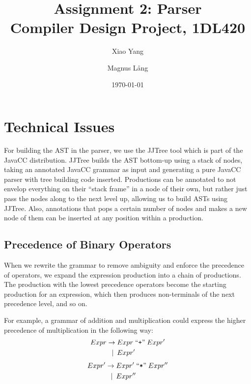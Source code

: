 \documentclass[a4paper,11pt]{article}
\title{Assignment 2: Parser \\
       Compiler Design Project, 1DL420}
\author{Xiao Yang \and Magnus L{\aa}ng} %
\date{\today}
\begin{document}
\maketitle

\section{Technical Issues}
For building the AST in the parser, we use the JJTree tool which is part of the JavaCC distribution.
JJTree builds the AST bottom-up using a stack of nodes, taking an annotated JavaCC grammar as input and generating a pure JavaCC parser with tree building code inserted.
Productions can be annotated to not envelop everything on their ``stack frame'' in a node of their own, but rather just pass the nodes along to the next level up, allowing us to build ASTs using JJTree.
Also, annotations that pops a certain number of nodes and makes a new node of them can be inserted at any position within a production.

\subsection{Precedence of Binary Operators}
When we rewrite the grammar to remove ambiguity and enforce the precedence of operators, we expand the expression production into a chain of productions.
The production with the lowest precedence operators become the starting production for an expression, which then produces non-terminals of the next precedence level, and so on.

For example, a grammar of addition and multiplication could express the higher precedence of multiplication in the following way:
\begin{align*}
  Expr \rightarrow &\; Expr \;\text{``\texttt{+}''}\; Expr' \\
       \mid \:     &\; Expr'
\end{align*}
\begin{align*}
  Expr' \rightarrow &\; Expr' \;\text{``\texttt{*}''}\; Expr'' \\
        \mid \:     &\; Expr''
\end{align*}
\end{document}
